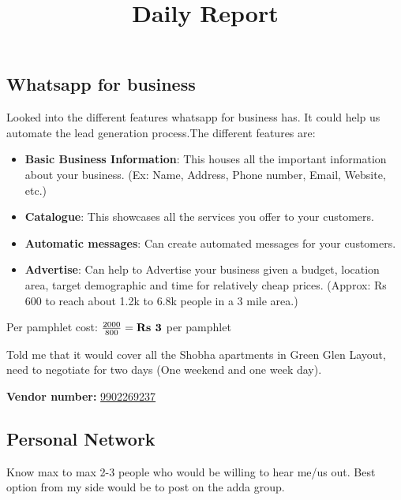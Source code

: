 \documentclass[12pt, a4paper]{article}
\begin{document}
\title{Daily Report}
\maketitle

\subsection{Whatsapp for business}

Looked into the different features whatsapp for business has. It could help us automate the lead generation process.The different features are:

\begin{itemize}
    \item \textbf{Basic Business Information}: This houses all the important information about your business. (Ex: Name, Address, Phone number, Email, Website, etc.)
    \item \textbf{Catalogue}: This showcases all the services you offer to your customers.
    \item \textbf{Automatic messages}: Can create automated messages for your customers.
    \item \textbf{Advertise}: Can help to Advertise your business given a budget, location area, target demographic and time for relatively cheap prices. (Approx: Rs 600 to reach about 1.2k to 6.8k people in a 3 mile area.)
\end{itemize}


\vspace{0.5cm}

Per pamphlet cost: $\frac{2000}{800} = \textbf{Rs \the\numexpr 2000 / 800 \relax} $ per pamphlet

\bigskip

\noindent Told me that it would cover all the Shobha apartments in Green Glen Layout, need to negotiate for two days (One weekend and one week day).

\bigskip

\textbf{Vendor number:} \href{tel:+919902269237}{9902269237}

\subsection{Personal Network}

Know max to max 2-3 people who would be willing to hear me/us out. Best option from my side would be to post on the adda group.

\vspace{0.25cm}
\end{document}
